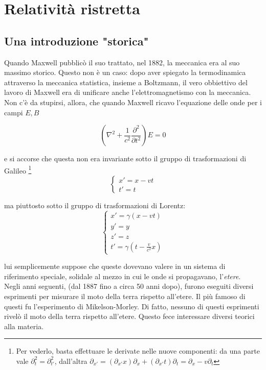 \documentclass{report}
\begin{document}
\newpage

\chapter{Relatività ristretta}

\section{Una introduzione "storica"}

Quando Maxwell pubblicò il suo trattato, nel 1882, la meccanica era al suo massimo storico. Questo non è un caso: dopo aver spiegato la termodinamica attraverso la meccanica statistica, insieme a Boltzmann, il vero obbiettivo del lavoro di Maxwell era di unificare anche l'elettromagnetismo con la meccanica. Non c'è da stupirsi, allora, che quando Maxwell ricavo l'equazione delle onde per i campi $E, B$

\begin{equation}
    \left(\nabla^2 + \frac{1}{c^2}\frac{\partial^2}{\partial t^2} \right)E = 0 
\end{equation}

e si accorse che questa non era invariante sotto il gruppo di trasformazioni di Galileo \footnote{Per vederlo, basta effettuare le derivate nelle nuove componenti: da una parte vale $\partial^2_t = \partial^2_{t'}$, dall'altra $\partial_{x'} = (\partial_{x'} x)\partial_x + (\partial_{x'}t)\partial_t = \partial_x - v\partial_t$}
\[\begin{cases}
    x' = x-vt \\ t' = t
\end{cases}\]

ma piuttosto sotto il gruppo di trasformazioni di Lorentz: 
\[\begin{cases}
    x' = \gamma (x - vt) \\ y' = y \\ z' = z \\ t' = \gamma \left(t - \frac{v}{c^2}x\right)
\end{cases}\]

lui semplicemente suppose che queste dovevano valere in un sistema di riferimento speciale, solidale al mezzo in cui le onde si propagavano, l'\emph{etere}. \\

Negli anni seguenti, (dal 1887 fino a circa 50 anni dopo), furono eseguiti diversi esprimenti per misurare il moto della terra rispetto all'etere. Il più famoso di questi fu l'esperimento di Mikelson-Morley. Di fatto, nessuno di questi esprimenti rivelò il moto della terra rispetto all'etere. Questo fece interessare diversi teorici alla materia. \\
\end{document}
